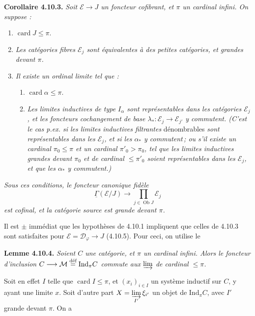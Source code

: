 \documentclass[11pt]{article}
\newcommand{\msp}[1]{\marginpar{\footnotesize [#1]}}
\newcommand{\Ind}{\mathrm{Ind}}
\newcommand{\Ob}{\operatorname{Ob}}
\newcommand{\card}{\operatorname{card}}
\newcommand{\uGamma}{\underline{\Gamma}}
\begin{document}
\textbf{Corollaire 4.10.3.} \textit{Soit $\mathcal{E} \longrightarrow J$ un foncteur cofibrant, et $\pi$ un cardinal infini. On suppose :}
\begin{enumerate}[label={}, leftmargin=3em]
\item[\textit{a)}] $\card J \leqslant \pi$.
\item[\textit{b)}] \textit{Les catégories fibres $\mathcal{E}_j$ sont équivalentes à des petites catégories, et grandes devant $\pi$.}
\item[\textit{c)}] \textit{Il existe un ordinal limite tel que :}
\begin{enumerate}[label={}, leftmargin=3em]
\item[\textit{1°)}] $\card \alpha \leqslant \pi$.
\item[\textit{2°)}] \msp{page 248}\textit{Les limites inductives de type $I_\alpha$ sont représentables dans les catégories $\mathcal{E}_j$, et les foncteurs cochangement de base $\lambda_* : \mathcal{E}_j \longrightarrow \mathcal{E}_{j'}$ y commutent. (C'est le cas p.ex. si les limites inductives filtrantes} dénombrables \textit{sont représentables dans les $\mathcal{E}_j$, et si les $\alpha_*$ y commutent\,; ou s'il existe un cardinal $\pi_0 \leqslant \pi$ et un cardinal $\pi'_0 > \pi_0$, tel que les limites inductives grandes devant $\pi_0$ et de cardinal $\leqslant \pi'_0$ soient représentables dans les $\mathcal{E}_j$, et que les $\alpha_*$ y commutent.)}
\end{enumerate}
\end{enumerate}
\textit{Sous ces conditions, le foncteur canonique fidèle}
\[
\uGamma(\mathcal{E}/J) \longrightarrow \prod_{j\in\Ob J} \mathcal{E}_j \tag*{(4.10.3.1)}
\]
\textit{est cofinal, et la catégorie source est grande devant $\pi$.}

Il est $\pm$ immédiat que les hypothèses de 4.10.1 impliquent que celles de 4.10.3 sont satisfaites pour $\mathcal{E} = \mathcal{D}_\varphi \longrightarrow J$ (4.10.5). Pour
\msp{page 249}
ceci, on utilise le

\textbf{Lemme 4.10.4.} \textit{Soient $C$ une catégorie, et $\pi$ un cardinal infini. Alors le foncteur d'inclusion $C \longrightarrow \mathcal{M} \overset{\textup{déf}}{=} \Ind_\pi C$ commute aux $\varinjlim$ de cardinal $\leqslant \pi$.}

Soit en effet $I$ telle que $\card I \leqslant \pi$, et $(x_i)_{i\in I}$ un système inductif sur $C$, y ayant une limite $x$. Soit d'autre part $X = \varinjlim\limits_{I'} \xi_{i'}$ un objet de $\Ind_\pi C$, avec $I'$ grande devant $\pi$. On a
\end{document}
